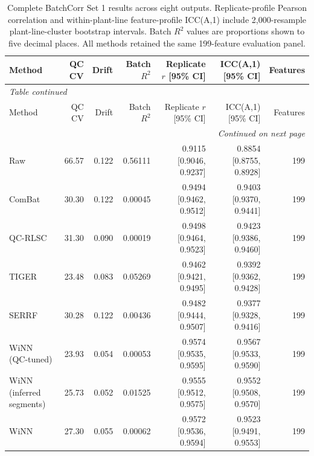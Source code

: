 \begin{landscape}
\scriptsize
\begin{longtable}{lrrrrrr}
\caption{Complete BatchCorr Set 1 results across eight outputs. Replicate-profile Pearson correlation and within-plant-line feature-profile ICC(A,1) include 2,000-resample plant-line-cluster bootstrap intervals. Batch $R^2$ values are proportions shown to five decimal places. All methods retained the same 199-feature evaluation panel.}\label{tab:supp_batchcorr_all}\\
\toprule
Method & QC CV & Drift & Batch $R^2$ & Replicate $r$ [95\% CI] & ICC(A,1) [95\% CI] & Features \\
\midrule
\endfirsthead
\multicolumn{7}{l}{\textit{Table \thetable{} continued}}\\
\toprule
Method & QC CV & Drift & Batch $R^2$ & Replicate $r$ [95\% CI] & ICC(A,1) [95\% CI] & Features \\
\midrule
\endhead
\midrule
\multicolumn{7}{r}{\textit{Continued on next page}}\\
\endfoot
\bottomrule
\endlastfoot
Raw & 66.57 & 0.122 & 0.56111 & 0.9115 [0.9046, 0.9237] & 0.8854 [0.8755, 0.8928] & 199 \\
ComBat & 30.30 & 0.122 & 0.00045 & 0.9494 [0.9462, 0.9512] & 0.9403 [0.9370, 0.9441] & 199 \\
QC-RLSC & 31.30 & 0.090 & 0.00019 & 0.9498 [0.9464, 0.9523] & 0.9423 [0.9386, 0.9460] & 199 \\
TIGER & 23.48 & 0.083 & 0.05269 & 0.9462 [0.9421, 0.9495] & 0.9392 [0.9362, 0.9428] & 199 \\
SERRF & 30.28 & 0.122 & 0.00436 & 0.9482 [0.9444, 0.9507] & 0.9377 [0.9328, 0.9416] & 199 \\
WiNN (QC-tuned) & 23.93 & 0.054 & 0.00053 & 0.9574 [0.9535, 0.9595] & 0.9567 [0.9533, 0.9590] & 199 \\
WiNN (inferred segments) & 25.73 & 0.052 & 0.01525 & 0.9555 [0.9512, 0.9575] & 0.9552 [0.9508, 0.9570] & 199 \\
WiNN & 27.30 & 0.055 & 0.00062 & 0.9572 [0.9536, 0.9594] & 0.9523 [0.9491, 0.9553] & 199 \\
\end{longtable}
\end{landscape}
